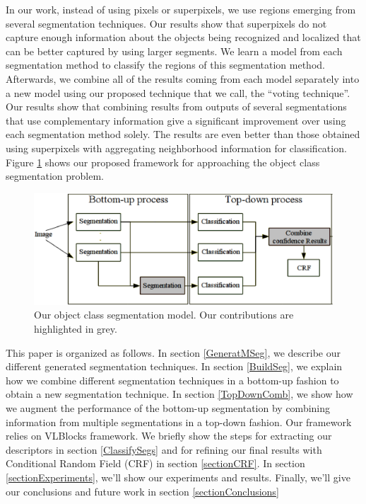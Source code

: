 \documentclass[10pt,twocolumn,letterpaper]{article}
\begin{document}
In our work, instead of using pixels or superpixels, we use regions emerging
from several segmentation techniques. Our results show that superpixels do
not capture enough information about the objects being recognized and
localized that can be better captured by using larger segments.
We learn a model from each segmentation method to classify the regions of
this segmentation method. Afterwards, we combine all of the results coming
from each model separately into a new model using our proposed technique that we call,
the ``voting technique''. Our results show that combining results from outputs of
several segmentations that use complementary information give a significant
improvement over using each segmentation method solely. The results are even better
than those obtained using superpixels with aggregating neighborhood information for
classification. Figure \ref{fig:our_obj_seg_model} shows our proposed framework for
approaching the object class segmentation problem.

\begin{figure}[!t]
\centering
\includegraphics[scale=.4]{./Figures/our_framework.eps}
\caption{Our object class segmentation model. Our contributions are highlighted in grey.}
\label{fig:our_obj_seg_model}
\end{figure}

This paper is organized as follows. In section \ref{GeneratMSeg}, we describe our different
generated segmentation techniques. In section \ref{BuildSeg}, we explain how we combine
different segmentation techniques in a bottom-up fashion to obtain a new segmentation technique.
In section \ref{TopDownComb}, we show how we augment the performance of the bottom-up segmentation
by combining information from multiple segmentations in a top-down fashion.
Our framework relies on VLBlocks \cite{fulkerson09class} framework. We briefly show the
steps for extracting our descriptors in section \ref{ClassifySegs} and for refining our final results
with Conditional Random Field (CRF) in section \ref{sectionCRF}. In section \ref{sectionExperiments},
we'll show our experiments and results. Finally, we'll give our conclusions and future work in
section \ref{sectionConclusions}
\end{document}
